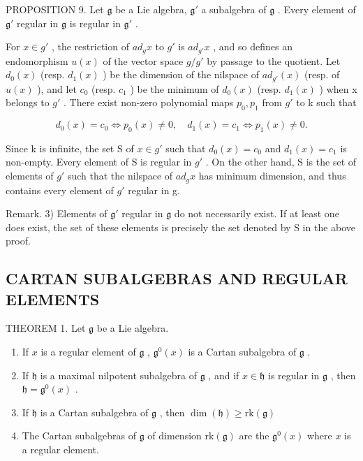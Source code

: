 PROPOSITION 9. Let \(\mathfrak{g}\) be a Lie algebra, \(\mathfrak{g}'\) a subalgebra of \(\mathfrak{g}\) . Every element of \(\mathfrak{g}'\) regular in \(\mathfrak{g}\) is regular in \(\mathfrak{g}'\) .

For \(x \in g'\) , the restriction of \(ad_{g}x\) to \(g'\) is \(ad_{g'}x\) , and so defines an endomorphism \(u(x)\) of the vector space \(g/g'\) by passage to the quotient. Let \(d_{0}(x)\) (resp. \(d_{1}(x)\) ) be the dimension of the nilspace of \(ad_{g'}(x)\) (resp. of \(u(x)\) ), and let \(c_{0}\) (resp. \(c_{1}\) ) be the minimum of \(d_{0}(x)\) (resp. \(d_{1}(x)\) ) when x belongs to \(g'\) . There exist non-zero polynomial maps \(p_{0}, p_{1}\) from \(g'\) to k such that

\[
d _ {0} (x) = c _ {0} \Longleftrightarrow p _ {0} (x) \neq 0, \quad d _ {1} (x) = c _ {1} \Longleftrightarrow p _ {1} (x) \neq 0.
\]

Since k is infinite, the set S of \(x \in g'\) such that \(d_{0}(x) = c_{0}\) and \(d_{1}(x) = c_{1}\) is non-empty. Every element of S is regular in \(g'\) . On the other hand, S is the set of elements of \(g'\) such that the nilspace of \(ad_{g}x\) has minimum dimension, and thus contains every element of \(g'\) regular in g.

Remark. 3) Elements of \(\mathfrak{g}'\) regular in \(\mathfrak{g}\) do not necessarily exist. If at least one does exist, the set of these elements is precisely the set denoted by S in the above proof.

\subsection{CARTAN SUBALGEBRAS AND REGULAR ELEMENTS}

THEOREM 1. Let \(\mathfrak{g}\) be a Lie algebra.

\begin{enumerate}
\def\labelenumi{(\roman{enumi})}
\item
  If \(x\) is a regular element of \(\mathfrak{g}\) , \(\mathfrak{g}^0(x)\) is a Cartan subalgebra of \(\mathfrak{g}\) .
\item
  If \(\mathfrak{h}\) is a maximal nilpotent subalgebra of \(\mathfrak{g}\) , and if \(x \in \mathfrak{h}\) is regular in \(\mathfrak{g}\) , then \(\mathfrak{h} = \mathfrak{g}^0(x)\) .
\item
  If \(\mathfrak{h}\) is a Cartan subalgebra of \(\mathfrak{g}\) , then \(\dim (\mathfrak{h})\geq \mathrm{rk}(\mathfrak{g})\)
\item
  The Cartan subalgebras of \(\mathfrak{g}\) of dimension \(\mathrm{rk}(\mathfrak{g})\) are the \(\mathfrak{g}^0 (x)\) where \(x\) is a regular element.
\end{enumerate}

